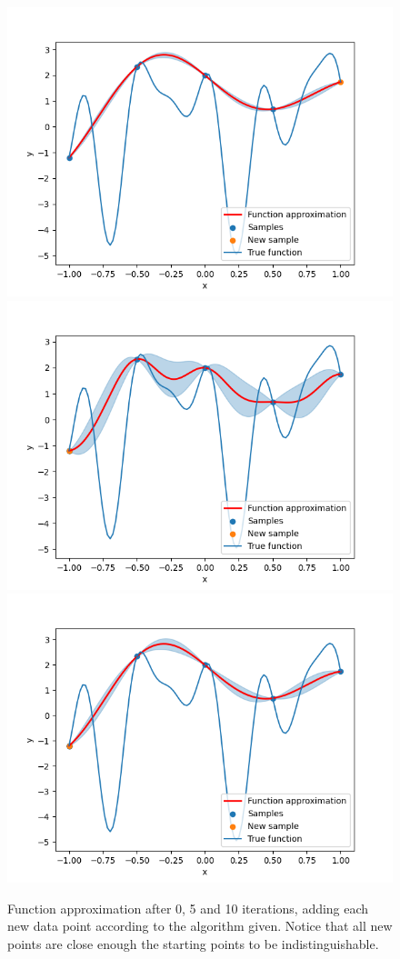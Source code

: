 \begin{figure}[H]
\centering
\includegraphics[width=0.3\linewidth]{images/bayesian_optimization_0.png}
\includegraphics[width=0.3\linewidth]{images/bayesian_optimization_4.png}
\includegraphics[width=0.3\linewidth]{images/bayesian_optimization_9.png}
\caption{Function approximation after 0, 5 and 10 iterations, adding each new data point according to the algorithm given. Notice that all new points are close enough the starting points to be indistinguishable.}
\label{fig:iter_naive}
\end{figure}

